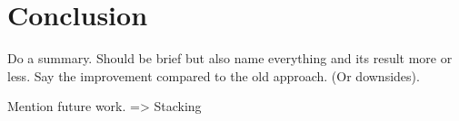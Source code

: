 \chapter{Conclusion}
Do a summary. Should be brief but also name everything and its result more or less.
Say the improvement compared to the old approach. (Or downsides).

Mention future work. => Stacking